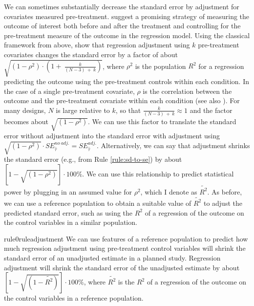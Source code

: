 \documentclass[12pt]{article}
\begin{document}
We can sometimes substantially decrease the standard error by adjustment
for covariates measured pre-treatment. 
\cite{Clifford2021} suggest a promising strategy of measuring the outcome of interest both before and after the treatment and controlling for the pre-treatment measure of the outcome in the regression model. 
Using the classical framework from above, \citet[547]{Cox1982} show that regression adjustment using $k$ pre-treatment covariates changes the standard error by a factor of about $\sqrt{\left( 1 - \rho^{2} \right) \cdot \left( 1 + \ \frac{k}{(N - 3)\  + \ k} \right)}$, where $\rho^{2}$ is the population $R^{2}$ for a regression predicting the outcome using the pre-treatment controls within each condition. 
In the case of a single pre-treatment covariate, $\rho$ is the correlation between the outcome and the pre-treatment covariate within each condition (see also \citealt{Boldt2024}). 
For many designs, $N$ is large relative to $k$, so that $\frac{k}{(N - 3)\  + \ k} \approx 1$ and the factor becomes about $\sqrt{\left( 1 - \rho^{2} \right)}$. 
We can use this factor to translate the standard error without adjustment into the standard error with adjustment using $\sqrt{\left( 1 - \rho^{2} \right)} \cdot SE_{\widehat{\tau}}^{no\ adj.} = SE_{\widehat{\tau}}^{adj.}$. 
Alternatively, we can say that adjustment shrinks the standard error (e.g., from Rule \ref{rule:sd-to-se}) by about $\left\lbrack 1 - \sqrt{\left( 1 - \rho^{2} \right)} \right\rbrack \cdot 100\%$.
We can use this relationship to predict statistical power by plugging in an assumed value for $\rho^{2}$, which I denote as $\widetilde{R^{2}}$.
As before, we can use a reference population to obtain a suitable value of $\widetilde{R^{2}}$ to adjust the predicted standard error, such as using the $R^{2}$ of a regression of the outcome on the control variables in a similar population.

\begin{restatable}[Adjustment]{rule0}{ruleadjustment}
\label{rule:adjustment}
We can use features of a reference population to predict how much regression adjustment using pre-treatment control variables will shrink the standard error of an unadjusted estimate in a planned study. Regression adjustment will shrink the standard error of the unadjusted estimate by about $\left\lbrack 1 - \sqrt{\left( 1 - \widetilde{R^{2}} \right)} \right\rbrack \cdot 100\%$, where $\widetilde{R^2}$ is the $R^2$ of a regression of the outcome on the control variables in a reference population.
\end{restatable}
\end{document}
